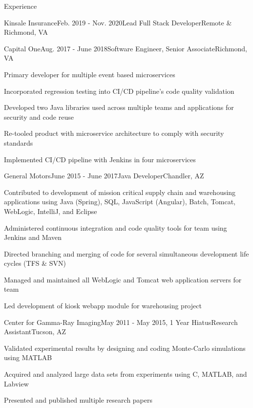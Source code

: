 \documentclass{resume} %
\begin{document}
\begin{rSection}{Experience}
\begin{rSubsection}{Kinsale Insurance}{Feb. 2019 - Nov. 2020}{\vspace{-0.5em}Lead Full Stack Developer}{Remote \& Richmond, VA}
	\end{rSubsection}


	\begin{rSubsection}{Capital One}{Aug. 2017 - June 2018}{Software Engineer, Senior Associate}{Richmond, VA}
		\vspace{-0.5em}\setlength{\itemindent}{.0in}\item{
			Primary developer for multiple event based microservices
		}
		\item Incorporated regression testing into CI/CD pipeline's code quality validation
		\item Developed two Java libraries used across multiple teams and applications for security and code reuse
		\item Re-tooled product with microservice architecture to comply with security standards
		\item Implemented CI/CD pipeline with Jenkins in four microservices

	\end{rSubsection}

	\begin{rSubsection}{General Motors}{June 2015 - June 2017}{Java Developer}{Chandler, AZ}
		\vspace{-0.5em}\setlength{\itemindent}{.0in}\item {
			Contributed to development of mission critical supply chain and warehousing applications using
			\newline
			Java (Spring), SQL, JavaScript (Angular), Batch, Tomcat, WebLogic, IntelliJ, and Eclipse
		}
		\item Administered continuous integration and code quality tools for team using Jenkins and Maven
		\item Directed branching and merging of code for several simultaneous development life cycles (TFS \& SVN)
		\item Managed and maintained all WebLogic and Tomcat web application servers for team
		\item Led development of kiosk webapp module for warehousing project
	
	\end{rSubsection}


	\begin{rSubsection}{Center for Gamma-Ray Imaging}{May 2011 - May 2015, 1 Year Hiatus}{Research Assistant}{Tucson, AZ}
	\item Validated experimental results by designing and coding Monte-Carlo simulations using MATLAB
	\item Acquired and analyzed large data sets from experiments using C, MATLAB, and Labview
	\item Presented and published multiple research papers

	\end{rSubsection}

\end{rSection}
\end{document}
